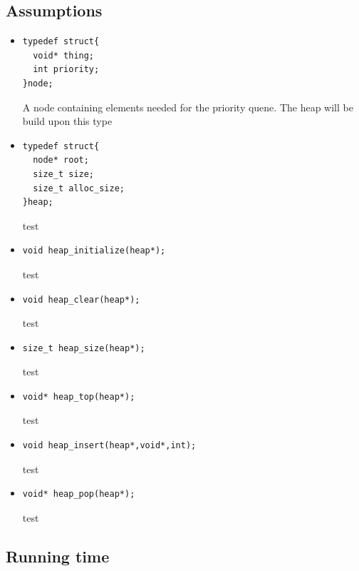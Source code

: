 \documentclass[11pt]{article}
\begin{document}
\subsection*{Assumptions}
\begin{itemize}
\item \begin{lstlisting}[style=customc] 
typedef struct{
  void* thing;
  int priority;
}node;
\end{lstlisting} 
A node containing elements needed for the priority quene. The heap will be build 
upon this type

\item \begin{lstlisting}[style=customc] 
typedef struct{
  node* root;
  size_t size;
  size_t alloc_size;
}heap;
\end{lstlisting} 
test


\item \begin{lstlisting}[style=customc] 
void heap_initialize(heap*);\end{lstlisting} 
test


\item \begin{lstlisting}[style=customc] 
void heap_clear(heap*); \end{lstlisting} 
test


\item \begin{lstlisting}[style=customc] 
size_t heap_size(heap*);\end{lstlisting} 
test


\item \begin{lstlisting}[style=customc] 
void* heap_top(heap*);\end{lstlisting} 
test


\item \begin{lstlisting}[style=customc] 
void heap_insert(heap*,void*,int); \end{lstlisting} 
test

\item \begin{lstlisting}[style=customc] 
void* heap_pop(heap*);\end{lstlisting} 
test


\end{itemize}
\subsection*{Running time}
    
   
\end{document}
